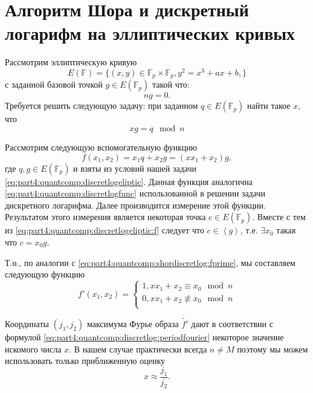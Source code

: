 \section{Алгоритм Шора и дискретный логарифм на эллиптических кривых} 
Рассмотрим эллиптическую кривую 
\[
E\left(\mathbb{F}\right) = \{
(x,y) \in \mathbb{F}_p \times \mathbb{F}_p, y^2 = x^3 +a x + b,
\}
\]
с заданной базовой точкой $g \in E\left(\mathbb{F}_p\right)$ такой что: 
\[
n g = 0.
\]
Требуется решить следующую задачу: при заданном $q
\in E\left(\mathbb{F}_p\right)$ найти такое $x$, что
\begin{equation}
x g = q \mod n
\label{eq:part4:quantcomp:discretlogeliptic}
\end{equation}

Рассмотрим следующую вспомогательную функцию
\begin{equation}
f(x_1, x_2) = x_1 q + x_2 g = \left(x x_1 + x_2\right) g,
\label{eq:part4:quantcomp:discretlogeliptic:f}
\end{equation}
где $q,g \in E\left(\mathbb{F}_p\right)$ и взяты из условий нашей
задачи \eqref{eq:part4:quantcomp:discretlogeliptic}. Данная функция
аналогична \eqref{eq:part4:quantcomp:discretlogfunc}
использованной в решении задачи дискретного логарифма. Далее
производится измерение этой функции. Результатом этого измерения
является некоторая точка $c \in E\left(\mathbb{F}_p\right)$. Вместе с
тем из \eqref{eq:part4:quantcomp:discretlogeliptic:f} следует что 
$c \in \left<g\right>$, т.е. $\exists x_0$ такая что $c = x_0 g$. 

Т.о., по аналогии с \eqref{eq:part4:quantcomp:shordiscretlog:fprime}, мы
составляем следующую функцию 
\begin{equation}
\label{eq:part4:quantcomp:shorelliptic:fprime}
f'\left(x_1, x_2\right) = 
\begin{cases}
1, x x_1 + x_2 \equiv x_0 \mod n \\
0, x x_1 + x_2 \not\equiv x_0 \mod n \\
\end{cases}
\end{equation}

Координаты $(j_1,j_2)$ максимума Фурье образа $\tilde{f'}$ дают в
соответствии с формулой
\eqref{eq:part4:quantcomp:discretlog:periodfourier} некоторое значение
искомого числа $x$. В нашем случае практически всегда $n \ne M$
поэтому мы можем использовать только приближенную оценку
\[
x \approx \frac{j_1}{j_2}.
\]

